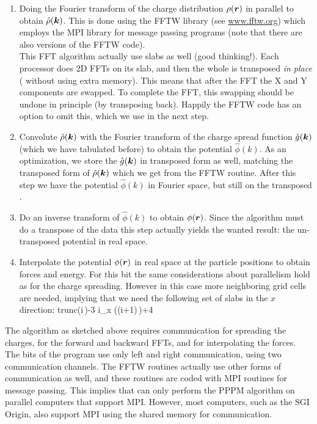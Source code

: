 \begin{enumerate}
\item   Doing the Fourier transform of the charge distribution $\rho(\mbox{\boldmath ${r}$})$ 
        in parallel to obtain $\hat{\rho}(\mbox{\boldmath ${k}$})$. This is done using
        the FFTW library (see \href{http://www.fftw.org}{www.fftw.org})
        which employs the MPI library for message passing programs
        (note that there are also  versions
        of the FFTW code).\\
        This FFT algorithm actually use slabs as well (good
        thinking!).  Each processor does 2D FFTs on its slab, and then
        the whole {\fftgrid} is transposed {\em in place}
        ({\ie} without using extra memory).  This means that after the
        FFT the X and Y components are swapped.  To complete the FFT,
        this swapping should be undone in principle (by transposing
        back).  Happily the FFTW code has an option to omit this,
        which we use in the next step.
\item   Convolute $\hat{\rho}(\mbox{\boldmath ${k}$})$ with the Fourier transform of the
        charge spread function $\hat{g}(\mbox{\boldmath ${k}$})$ (which we have tabulated before)
        to obtain the potential $\hat{\phi}(k)$. 
        As an optimization, we store the $\hat{g}(\mbox{\boldmath ${k}$})$  in transposed form
        as well, matching the transposed form of $\hat{\rho}(\mbox{\boldmath ${k}$})$
        which we get from the FFTW routine. After this step we have the 
        potential $\hat{\phi}(k)$ in Fourier space, but still on the transposed
        {\fftgrid}.
\item   Do an inverse transform of $\hat{\phi}(k)$ to obtain
        ${\phi}(\mbox{\boldmath ${r}$})$. Since the algorithm must do a transpose of the data
        this step actually yields the wanted result: the un-transposed
        potential in real space.
\item   Interpolate the potential ${\phi}(\mbox{\boldmath ${r}$})$ in real space at the particle
        positions to obtain forces and energy. For this bit the same considerations
 	about parallelism hold as for the charge spreading. However in this
        case more neighboring grid cells are needed, implying that we need
        the following set of {\fftgrid} slabs in the $x$ direction:
        \beq
        {\rm trunc}\left(i\,\right)-3 \le i_x \left((i+1)\,\right)+4
        \eeq

\end{enumerate}
The algorithm as sketched above requires communication for spreading
the charges, for the forward and backward FFTs, and for interpolating
the forces.  The {\gromacs} bits of the program use only left and
right communication, {\ie} using two communication channels. The FFTW
routines actually use other forms of communication as well, and these
routines are coded with MPI routines for message passing. This implies
that {\gromacs} can only perform the PPPM algorithm on parallel
computers that support MPI. However, most
 computers, such as the SGI Origin, also
support MPI using the 
shared memory for communication.

